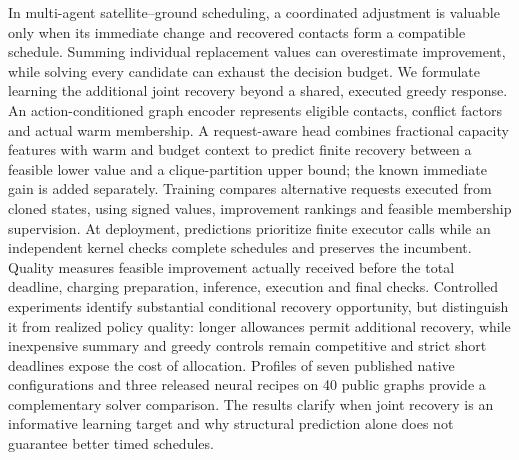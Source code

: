 In multi-agent satellite--ground scheduling, a coordinated adjustment is valuable
only when its immediate change and recovered contacts form a compatible
schedule. Summing individual replacement values can overestimate improvement,
while solving every candidate can exhaust the decision budget. We formulate
learning the additional joint recovery beyond a shared, executed greedy
response. An action-conditioned graph encoder represents eligible contacts,
conflict factors and actual warm membership. A request-aware head combines
fractional capacity features with warm and budget context to predict finite
recovery between a feasible lower value and a clique-partition upper bound;
the known immediate gain is added separately. Training compares alternative
requests executed from cloned states, using signed values, improvement rankings
and feasible membership supervision. At deployment, predictions prioritize
finite executor calls while an independent kernel checks complete schedules
and preserves the incumbent. Quality measures feasible improvement actually
received before the total deadline, charging preparation, inference, execution
and final checks.
Controlled experiments identify substantial conditional recovery opportunity,
but distinguish it from realized policy quality: longer allowances permit
additional recovery, while inexpensive summary and greedy controls remain
competitive and strict short deadlines expose the cost of allocation.
Profiles of seven published native configurations and three released neural
recipes on 40 public graphs provide a complementary solver comparison.
The results clarify when joint recovery is an informative learning target
and why structural prediction alone does not guarantee better timed schedules.
